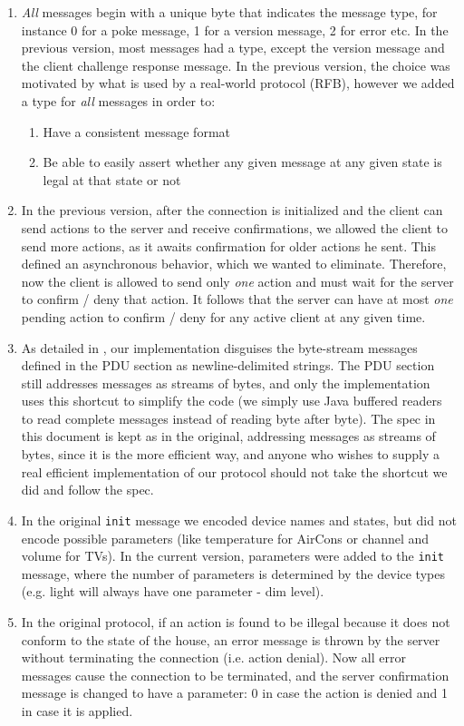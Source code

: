 \begin{enumerate}
\item {\em All} messages begin with a unique byte that indicates the message type, for instance 0 for a poke message, 1 for a version message, 2 for error etc. In the previous version, most messages had a type, except the version message and the client challenge response message. In the previous version, the choice was motivated by what is used by a real-world protocol (RFB), however we added a type for {\em all} messages in order to:
    \begin{enumerate}
        \item Have a consistent message format
        \item Be able to easily assert whether any given message at any given state is legal at that state or not
    \end{enumerate}
\item In the previous version, after the connection is initialized and the client can send actions to the server and receive confirmations, we allowed the client to send more actions, as it awaits confirmation for older actions he sent. This defined an asynchronous behavior, which we wanted to eliminate.
    Therefore, now the client is allowed to send only {\em one} action and must wait for the server to confirm / deny that action. It follows that the server can have at most {\em one} pending action to confirm / deny for any active client at any given time.
\item As detailed in , our implementation disguises the byte-stream messages defined in the PDU section as newline-delimited strings. The PDU section still addresses messages as streams of bytes, and only the implementation uses this shortcut to simplify the code (we simply use Java buffered readers to read complete messages instead of reading byte after byte). The spec in this document is kept as in the original, addressing messages as streams of bytes, since it is the more efficient way, and anyone who wishes to supply a real efficient implementation of our protocol should not take the shortcut we did and follow the spec.
\item In the original {\tt init} message we encoded device names and states, but did not encode possible parameters (like temperature for AirCons or channel and volume for TVs). In the current version, parameters were added to the {\tt init} message, where the number of parameters is determined by the device types (e.g. light will always have one parameter - dim level).
\item In the original protocol, if an action is found to be illegal because it does not conform to the state of the house, an error message is thrown by the server without terminating the connection (i.e. action denial). Now all error messages cause the connection to be terminated, and the server    confirmation message is changed to have a parameter: 0 in case the action is denied and 1 in case it is applied.
\end{enumerate}

